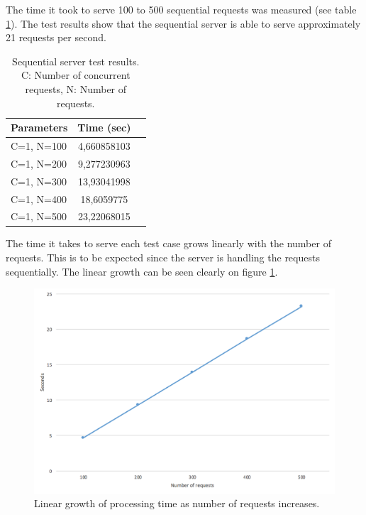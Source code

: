 \documentclass[a4paper, 11pt]{article}
\begin{document}
\newline
\newline

The time it took to serve 100 to 500 sequential requests was measured (see table \ref{tab:sequential_results}). The test results show that the sequential server is able to serve approximately 21 requests per second.

\begin{table}[h]
\centering
\begin{tabular}{lcc}
Parameters & Time (sec)\\\hline
C=1, N=100 & 4,660858103\\\hline
C=1, N=200 & 9,277230963\\\hline
C=1, N=300 & 13,93041998\\\hline
C=1, N=400 & 18,6059775\\\hline
C=1, N=500 & 23,22068015\\\hline
\end{tabular}
\caption{Sequential server test results. C: Number of concurrent requests, N: Number of requests.}
\label{tab:sequential_results}
\end{table}

The time it takes to serve each test case grows linearly with the number of requests. This is to be expected since the server is handling the requests sequentially. The linear growth can be seen clearly on figure \ref{fig:seq_numrequests_seconds}.

\begin{figure}[h]
  \begin{center}
    \includegraphics[width=\linewidth]{sequential_numrequests_seconds.png}
    \caption{Linear growth of processing time as number of requests increases.}
    \label{fig:seq_numrequests_seconds}
  \end{center}
\end{figure}
\end{document}
